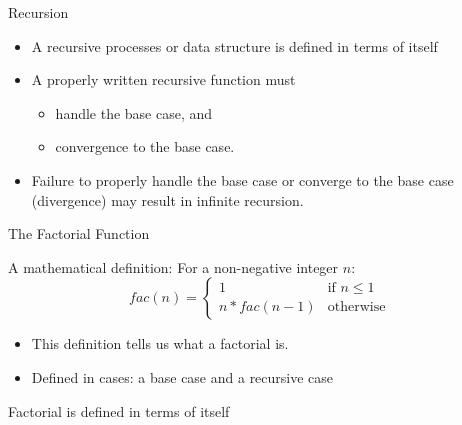 \documentclass{beamer}
\author[Chris Simpkins] 
{Christopher Simpkins \\\texttt{chris.simpkins@gatech.edu}}
\institute[Georgia Tech] %
\date[CS 1331]{}
\begin{document}
\begin{frame}
  \titlepage
\end{frame}


\begin{frame}[fragile]{Recursion}


\begin{itemize}
\item A recursive processes or data structure is defined in terms of itself
\item A properly written recursive function must
\begin{itemize}
\item handle the base case, and
\item convergence to the base case.
\end{itemize}
\item Failure to properly handle the base case or converge to the base case (divergence) may result in infinite recursion.
\end{itemize}


\end{frame}

\begin{frame}[fragile]{The Factorial Function}


A mathematical definition: For a non-negative integer $n$:
\begin{equation*}
    fac(n) = \begin{cases}
               1                   & \text{if } n \le 1\\
               n * fac(n-1)        & \text{otherwise}
           \end{cases}
\end{equation*}

\begin{itemize}
\item This definition tells us what a factorial is.
\item Defined in cases: a base case and a recursive case
\end{itemize}
 Factorial is defined in terms of itself

\end{frame}
\end{document}
